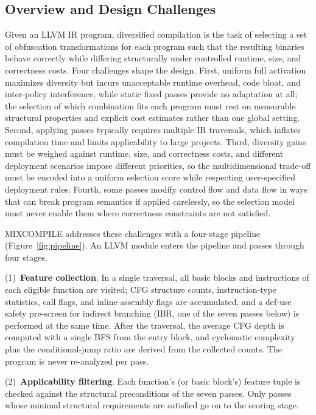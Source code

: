 \documentclass[pdflatex,sn-mathphys-num]{sn-jnl}
\theoremstyle{thmstyleone}%
\theoremstyle{thmstyletwo}%
\theoremstyle{thmstylethree}%
\begin{document}
\subsection{Overview and Design Challenges}
\label{sec:overview}

Given an LLVM IR program, diversified compilation is the task of selecting a set of
obfuscation transformations for each program such that the resulting binaries behave
correctly while differing structurally under controlled runtime, size, and correctness
costs. Four challenges shape the design. First, uniform full activation maximizes
diversity but incurs unacceptable runtime overhead, code bloat, and inter-policy
interference, while static fixed passes provide no adaptation at all; the selection of
which combination fits each program must rest on measurable structural properties and
explicit cost estimates rather than one global setting. Second, applying passes
typically requires multiple IR traversals, which inflates compilation time and limits
applicability to large projects. Third, diversity gains must be weighed against
runtime, size, and correctness costs, and different deployment scenarios impose
different priorities, so the multidimensional trade-off must be encoded into a uniform
selection score while respecting user-specified deployment rules. Fourth, some passes
modify control flow and data flow in ways that can break program semantics if applied
carelessly, so the selection model must never enable them where correctness
constraints are not satisfied.

MIXCOMPILE addresses these challenges with a four-stage pipeline
(Figure~\ref{fig:pipeline}). An LLVM module enters the pipeline and passes
through four stages.

(1)~\textbf{Feature collection}. In a single traversal, all basic blocks
and instructions of each eligible function are visited; CFG structure counts,
instruction-type statistics, call flags, and inline-assembly flags are accumulated, and
a def-use safety pre-screen for indirect branching (IBR, one of the seven passes
below) is performed at the same time. After the traversal,
the average CFG depth is computed with a single BFS from the entry block, and
cyclomatic complexity plus the conditional-jump ratio are derived from the collected
counts. The program is never re-analyzed per pass.

(2)~\textbf{Applicability filtering}. Each function's (or basic block's)
feature tuple is checked against the structural preconditions of the seven passes.
Only passes whose minimal structural requirements are satisfied go on to the scoring
stage.
\end{document}
